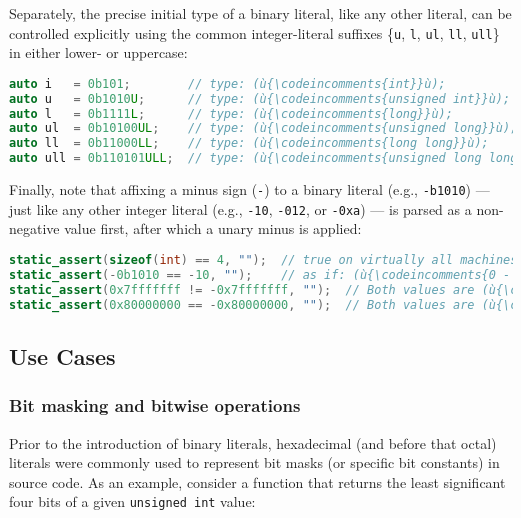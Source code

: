 \noindent Separately, the precise initial type of a binary literal, like any other
literal, can be controlled explicitly using the common integer-literal
suffixes \{\texttt{u}, \texttt{l}, \texttt{ul}, \texttt{ll},
\texttt{ull}\} in either lower- or uppercase:

\begin{lstlisting}[language=C++]
auto i   = 0b101;        // type: (ù{\codeincomments{int}}ù);                 value: 5
auto u   = 0b1010U;      // type: (ù{\codeincomments{unsigned int}}ù);        value: 10
auto l   = 0b1111L;      // type: (ù{\codeincomments{long}}ù);                value: 15
auto ul  = 0b10100UL;    // type: (ù{\codeincomments{unsigned long}}ù);       value: 20
auto ll  = 0b11000LL;    // type: (ù{\codeincomments{long long}}ù);           value: 24
auto ull = 0b110101ULL;  // type: (ù{\codeincomments{unsigned long long}}ù);  value: 53
\end{lstlisting}


\noindent Finally, note that affixing a minus sign (\texttt{-}) to a binary
literal (e.g., \texttt{-b1010}) --- just like any other integer literal
(e.g., \texttt{-10}, \texttt{-012}, or \texttt{-0xa}) --- is parsed as a
non-negative value first, after which a unary minus is applied:

\begin{lstlisting}[language=C++]
static_assert(sizeof(int) == 4, "");  // true on virtually all machines today
static_assert(-0b1010 == -10, "");    // as if: (ù{\codeincomments{0 - 0b1010 == 0 - 10}}ù)
static_assert(0x7fffffff != -0x7fffffff, "");  // Both values are (ù{\codeincomments{signed int}}ù).
static_assert(0x80000000 == -0x80000000, "");  // Both values are (ù{\codeincomments{unsigned int}}ù).
\end{lstlisting}


\subsection[Use Cases]{Use Cases}\label{use-cases}

\subsubsection[Bit masking and bitwise operations]{Bit masking and bitwise operations}\label{bit-masking-and-bitwise-operations}

Prior to the introduction of binary literals, hexadecimal (and before
that octal) literals were commonly used to represent bit masks (or
specific bit constants) in source code. As an example, consider a
function that returns the least significant four bits of a given
\texttt{unsigned}~\texttt{int} value:

